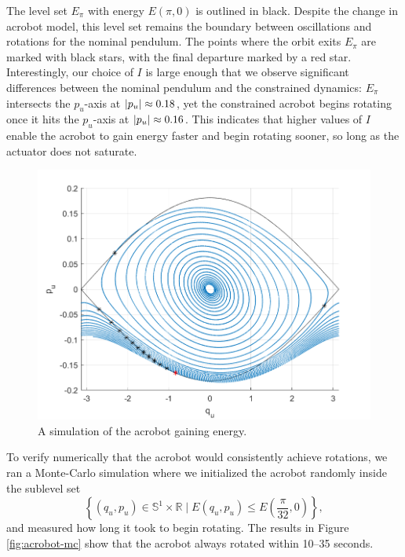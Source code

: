 \documentclass[journal,twoside,web]{ieeecolor}
\DeclarePairedDelimiter{\abs}{\lvert}{\rvert}
\newcommand*{\R}{\mathbb{R}}
\newcommand*{\Sone}{\mathbb{S}^1}
\newcommand*{\SxR}{\Sone \times \R}
\begin{document}
The level set \(E_\pi\) with energy \(E(\pi,0)\) is outlined in black.
Despite the change in acrobot model, this level set remains the boundary
between oscillations and rotations for the nominal pendulum.
The points where the orbit exits \(E_\pi\) are marked with black stars,
with the final departure marked by a red star.
Interestingly, our choice of \(I\) is large enough that we observe significant
differences between the nominal pendulum and the constrained dynamics:
\(E_\pi\) intersects the \(p_u\)-axis at \(\abs{p_u} \approx 0.18\), yet the
constrained acrobot begins rotating once it hits the
\(p_u\)-axis at \(\abs{p_u} \approx 0.16\). 
This indicates that higher values of \(I\) enable the acrobot to gain energy
faster and begin rotating sooner, so long as the actuator does not saturate.

\begin{figure}[]
    \centering
    \includegraphics[width=0.8\linewidth]{acrobot_in_orbit.png}
    \caption{A simulation of the acrobot gaining energy.}
    \label{fig:acrobot-in-orbit}
\end{figure}

To verify numerically that the acrobot would consistently achieve rotations, we
ran a Monte-Carlo simulation \cite{montecarlo} where we initialized the acrobot
randomly inside the sublevel set
\[
    \left\{(q_u,p_u) \in \SxR \mid
    E(q_u,p_u) \leq E\left(\frac{\pi}{32},0\right)\right\}
    ,
\] 
and measured how long it took to begin rotating.
The results in Figure \ref{fig:acrobot-mc} show that
the acrobot always rotated within 10--35 seconds.
\end{document}
